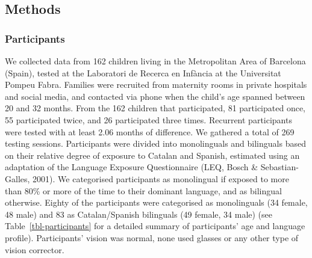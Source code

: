 \documentclass[
  12pt,
  b5paperpaper,
  twoside]{scrreprt}
\begin{document}
\hypertarget{methods-1}{%
\subsection{Methods}\label{methods-1}}

\hypertarget{participants-1}{%
\subsubsection{Participants}\label{participants-1}}

We collected data from 162 children living in the Metropolitan Area of
Barcelona (Spain), tested at the Laboratori de Recerca en Infància at
the Universitat Pompeu Fabra. Families were recruited from maternity
rooms in private hospitals and social media, and contacted via phone
when the child's age spanned between 20 and 32 months. From the 162
children that participated, 81 participated once, 55 participated twice,
and 26 participated three times. Recurrent participants were tested with
at least 2.06 months of difference. We gathered a total of 269 testing
sessions. Participants were divided into monolinguals and bilinguals
based on their relative degree of exposure to Catalan and Spanish,
estimated using an adaptation of the Language Exposure Questionnaire
(LEQ, Bosch \& Sebastian-Galles, 2001). We categorised participants as
monolingual if exposed to more than 80\% or more of the time to their
dominant language, and as bilingual otherwise. Eighty of the
participants were categorised as monolinguals (34 female, 48 male) and
83 as Catalan/Spanish bilinguals (49 female, 34 male) (see
Table~\ref{tbl-participants} for a detailed summary of participants' age
and language profile). Participants' vision was normal, none used
glasses or any other type of vision corrector.
\end{document}
